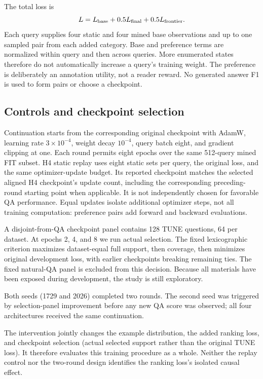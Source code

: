 \documentclass[pdflatex,sn-mathphys-num]{sn-jnl}
\begin{document}
The total loss is
\begin{equation}
L=L_{\rm base}+0.5L_{\rm final}+0.5L_{\rm frontier}.
\end{equation}
Each query supplies four static and four mined base observations and up to
one sampled pair from each added category. Base and preference terms are
normalized within query and then across queries. More enumerated states
therefore do not automatically increase a query's training weight.
The preference is deliberately an annotation utility, not a reader reward.
No generated answer F1 is used to form pairs or choose a checkpoint.

\subsection{Controls and checkpoint selection}
Continuation starts from the corresponding original checkpoint with AdamW,
learning rate $3\times10^{-4}$, weight decay $10^{-4}$, query batch eight,
and gradient clipping at one. Each round permits eight epochs over the same
512-query mined FIT subset. H4 static replay uses eight static sets per
query, the original loss, and the same optimizer-update budget. Its reported
checkpoint matches the selected aligned H4 checkpoint's update count,
including the corresponding preceding-round starting point when applicable.
It is not independently chosen for favorable QA performance.
Equal updates isolate additional optimizer steps, not all training
computation: preference pairs add forward and backward evaluations.

A disjoint-from-QA checkpoint panel contains 128 TUNE questions, 64 per
dataset. At epochs 2, 4, and 8 we run actual selection. The fixed
lexicographic criterion maximizes dataset-equal full support, then coverage,
then minimizes original development loss, with earlier checkpoints breaking
remaining ties. The fixed natural-QA panel is excluded from this decision.
Because all materials have been exposed during development, the study is
still exploratory.

Both seeds (1729 and 2026) completed two rounds. The second seed was
triggered by selection-panel improvement before any new QA score was
observed; all four architectures received the same continuation.

The intervention jointly changes the example distribution, the added
ranking loss, and checkpoint selection (actual selected support rather than
the original TUNE loss). It therefore evaluates this training procedure as
a whole. Neither the replay control nor the two-round design identifies
the ranking loss's isolated causal effect.
\end{document}
